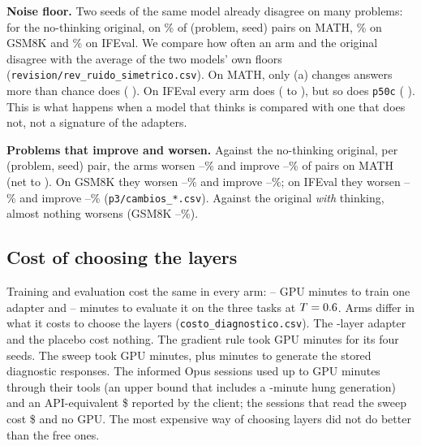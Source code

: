 \documentclass[11pt]{article}
\begin{document}
\textbf{Noise floor.} Two seeds of the same model already disagree on many problems: for the no-thinking original, on \% of (problem, seed) pairs on MATH, \% on GSM8K and \% on IFEval. We compare how often an arm and the original disagree with the average of the two models' own floors (\texttt{revision/rev\_ruido\_simetrico.csv}). On MATH, only (a) changes answers more than chance does ( ). On IFEval every arm does ( to ), but so does \texttt{p50c} ( ). This is what happens when a model that thinks is compared with one that does not, not a signature of the adapters.

\textbf{Problems that improve and worsen.} Against the no-thinking original, per (problem, seed) pair, the arms worsen --\% and improve --\% of pairs on MATH (net  to ). On GSM8K they worsen --\% and improve --\%; on IFEval they worsen --\% and improve --\% (\texttt{p3/cambios\_*.csv}). Against the original \emph{with} thinking, almost nothing worsens (GSM8K --\%).

\subsection{Cost of choosing the layers}\label{sec:4.7}

Training and evaluation cost the same in every arm: -- GPU minutes to train one adapter and -- minutes to evaluate it on the three tasks at $T=0.6$. Arms differ in what it costs to choose the layers (\texttt{costo\_diagnostico.csv}). The \NLayersFull{}-layer adapter and the placebo cost nothing. The gradient rule took  GPU minutes for its four seeds. The sweep took  GPU minutes, plus  minutes to generate the stored diagnostic responses. The  informed Opus sessions used up to  GPU minutes through their tools (an upper bound that includes a -minute hung generation) and an API-equivalent \$ reported by the client; the  sessions that read the sweep cost \$ and no GPU. The most expensive way of choosing layers did not do better than the free ones.
\end{document}
